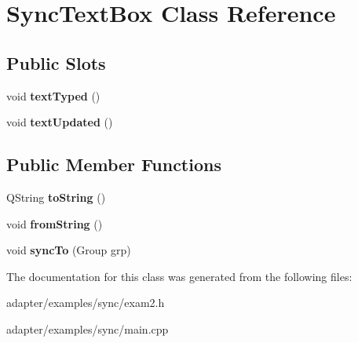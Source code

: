 \hypertarget{classSyncTextBox}{
\section{SyncTextBox Class Reference}
\label{classSyncTextBox}
}
\subsection*{Public Slots}
\begin{DoxyCompactItemize}
\item 
\hypertarget{classSyncTextBox_a70e5abaa925d7bd3f344156b69182544}{
void {\bfseries textTyped} ()}
\label{classSyncTextBox_a70e5abaa925d7bd3f344156b69182544}

\item 
\hypertarget{classSyncTextBox_a405d0b6c581451ff8e84c489a4434ac2}{
void {\bfseries textUpdated} ()}
\label{classSyncTextBox_a405d0b6c581451ff8e84c489a4434ac2}

\end{DoxyCompactItemize}
\subsection*{Public Member Functions}
\begin{DoxyCompactItemize}
\item 
\hypertarget{classSyncTextBox_adeb5c3586b4cf3264be225bdbd38d693}{
QString {\bfseries toString} ()}
\label{classSyncTextBox_adeb5c3586b4cf3264be225bdbd38d693}

\item 
\hypertarget{classSyncTextBox_a80a91c980a25feabc57523fcdd0476a9}{
void {\bfseries fromString} ()}
\label{classSyncTextBox_a80a91c980a25feabc57523fcdd0476a9}

\item 
\hypertarget{classSyncTextBox_a640ce6462b534c9c639a837fa1c375ff}{
void {\bfseries syncTo} (Group grp)}
\label{classSyncTextBox_a640ce6462b534c9c639a837fa1c375ff}

\end{DoxyCompactItemize}


The documentation for this class was generated from the following files:\begin{DoxyCompactItemize}
\item 
adapter/examples/sync/exam2.h\item 
adapter/examples/sync/main.cpp\end{DoxyCompactItemize}
